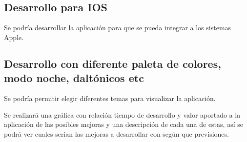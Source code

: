 \subsection{Desarrollo para IOS}
Se podría desarrollar la aplicación para que se pueda integrar a los sistemas Apple.

\subsection{Desarrollo con diferente paleta de colores, modo noche, daltónicos etc}
Se podría permitir elegir diferentes temas para visualizar la aplicación.

Se realizará una gráfica con relación tiempo de desarrollo y valor aportado a la aplicación de las posibles mejoras y una descripción de cada una de estas, así se podrá ver cuales serían las mejoras a desarrollar con según que previsiones.